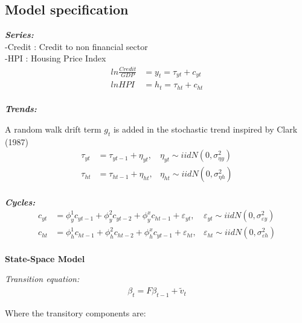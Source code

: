 \documentclass[12pt]{article}
\begin{document}
\begin{outline}[enumerate]
		\subsection{Model specification}
		
		\textbf{\textit{Series:}} \\
		-Credit : Credit to non financial sector\\
		-HPI : Housing Price Index
		\begin{align}
		ln \frac{Credit}{GDP} &= y_t = \tau_{yt} + c_{yt}
		\\
		ln HPI &= h_t = \tau_{ht} + c_{ht}
		\end{align}
		\\
		\textbf{\textit{Trends:}}
		
		A random walk drift term $g_t$ is added in the stochastic trend inspired by Clark (1987)
		\begin{align}
		\tau_{yt} &= \tau_{yt-1} + \eta_{yt}, &\eta_{yt} \sim iidN(0,\sigma^2_{\eta y})
		\\
		\tau_{ht} &= \tau_{ht-1} + \eta_{ht}, &\eta_{ht} \sim iidN(0,\sigma^2_{\eta h})	
		\end{align}
		\\
		\textbf{\textit{Cycles:}}
		\begin{align}
		c_{yt} &= \phi^1_{y}c_{yt-1}  
		+ \phi^2_{y}c_{yt-2}  
		+ \phi^x_{y}c_{ht-1} 
		+ \varepsilon_{yt},
		&\varepsilon_{yt} \sim iidN(0,\sigma^2_{\varepsilon y})		   
		\\
		c_{ht} &= \phi^1_{h}c_{ht-1}  
		+ \phi^2_{h}c_{ht-2}
		+ \phi^x_{h}c_{yt-1}  
		+ \varepsilon_{ht},
		&\varepsilon_{ht} \sim iidN(0,\sigma^2_{\varepsilon h})
		\end{align}
		\\
		
		
		\textbf{State-Space Model}
		
		\textit{Transition equation:}
		\begin{align}
		\beta_t = F\beta_{t-1} + \tilde{v}_t
		\end{align}
		
		Where the transitory components are:
		

\end{outline}
\end{document}
